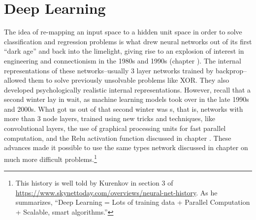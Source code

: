 \chapter{Deep Learning}\label{deepNets}



The idea of re-mapping an input space to a hidden unit space in order to solve classification and regression problems is what drew neural networks out of its first ``dark age'' and back into the limelight, giving rise to an explosion of interest in engineering and connectionism in the 1980s and 1990s (chapter ). The internal representations of these networks--usually 3 layer networks trained by backprop--allowed them to solve previously unsolvable problems like XOR. They also developed psychologically realistic internal representations. However, recall that a second  winter lay in wait, as machine learning models took over in the late 1990s and 2000s. What got us out of that second winter was s, that is, networks with more than 3 node layers, trained using new tricks and techniques, like convolutional layers, the use of graphical processing units for fast parallel computation, and the Relu activation function discussed in chapter . These advances made it possible to use the same types network discussed in chapter  on much more difficult problems.\footnote{This history is well told by Kurenkov in section 3 of \url{https://www.skynettoday.com/overviews/neural-net-history}. As he summarizes, ``Deep Learning = Lots of training data + Parallel Computation + Scalable, smart algorithms.''} 

